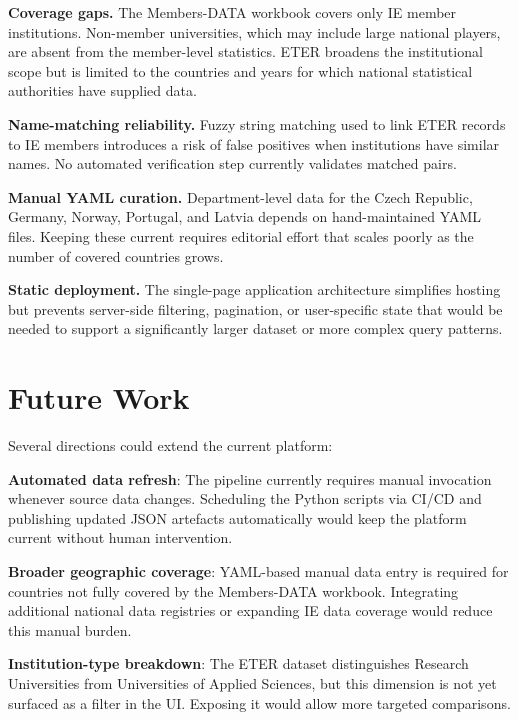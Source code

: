 \documentclass[final,3p,times,twocolumn]{elsarticle}
\begin{document}
\textbf{Coverage gaps.} The Members-DATA workbook covers only IE member institutions. Non-member universities, which may include large national players, are absent from the member-level statistics. ETER broadens the institutional scope but is limited to the countries and years for which national statistical authorities have supplied data.

\textbf{Name-matching reliability.} Fuzzy string matching used to link ETER records to IE members introduces a risk of false positives when institutions have similar names. No automated verification step currently validates matched pairs.

\textbf{Manual YAML curation.} Department-level data for the Czech Republic, Germany, Norway, Portugal, and Latvia depends on hand-maintained YAML files. Keeping these current requires editorial effort that scales poorly as the number of covered countries grows.

\textbf{Static deployment.} The single-page application architecture simplifies hosting but prevents server-side filtering, pagination, or user-specific state that would be needed to support a significantly larger dataset or more complex query patterns.

\section{Future Work}
\label{sec:futurework}

Several directions could extend the current platform:

\textbf{Automated data refresh}: The pipeline currently requires manual invocation whenever source data changes. Scheduling the Python scripts via CI/CD and publishing updated JSON artefacts automatically would keep the platform current without human intervention.

\textbf{Broader geographic coverage}: YAML-based manual data entry is required for countries not fully covered by the Members-DATA workbook. Integrating additional national data registries or expanding IE data coverage would reduce this manual burden.

\textbf{Institution-type breakdown}: The ETER dataset distinguishes Research Universities from Universities of Applied Sciences, but this dimension is not yet surfaced as a filter in the UI. Exposing it would allow more targeted comparisons.
\end{document}
